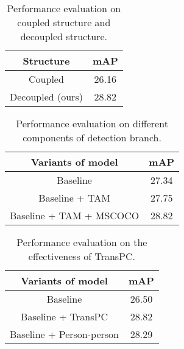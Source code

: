 \documentclass[final]{cvpr}
\begin{document}
\begin{table} [t]
\begin{center}
\small
\begin{tabular}{c|c}
\toprule
Structure & mAP  \\
\midrule
Coupled &  26.16\\
Decoupled (ours) & 28.82 \\
\bottomrule
\end{tabular}
\end{center}
\vspace{-5mm}
\caption{Performance evaluation on coupled structure and decoupled structure.}
\label{decouple}
\end{table}

\begin{table} [t]
\begin{center}
\small
\begin{tabular}{c|c}
\toprule
Variants of model & mAP  \\
\midrule
Baseline & 27.34 \\
Baseline + TAM & 27.75 \\
Baseline + TAM + MSCOCO & 28.82 \\
\bottomrule
\end{tabular}
\end{center}
\vspace{-5mm}
\caption{Performance evaluation on different components of detection branch.}
\label{detection branch}
\end{table}

\begin{table} [t]
\begin{center}
\small
\begin{tabular}{c|c}
\toprule
Variants of model & mAP  \\
\midrule
Baseline & 26.50 \\
Baseline + TransPC & 28.82 \\
Baseline + Person-person & 28.29 \\
\bottomrule
\end{tabular}
\end{center}
\vspace{-5mm}
\caption{Performance evaluation on the effectiveness of TransPC.}
\label{TransPC}
\end{table}
\end{document}
